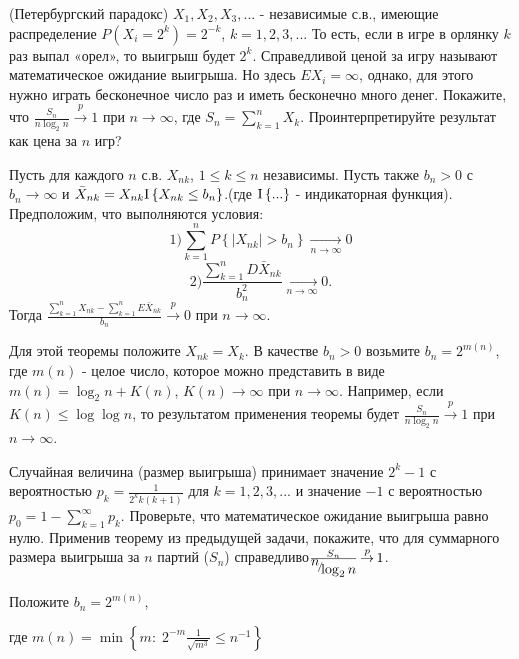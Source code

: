 \begin{problem}
(Петербургский парадокс) $X_{1} ,X_{2} ,X_{3} ,...$ - независимые с.в., имеющие распределение $P\left(X_{i} =2^{k} \right)=2^{-k} $, $k=1,2,3,...$ То есть, если в игре в орлянку $k$ раз выпал «орел», то выигрыш будет $2^{k} $. Справедливой ценой за игру называют математическое ожидание выигрыша. Но здесь $EX_{i} =\infty $, однако, для этого нужно играть бесконечное число раз и иметь бесконечно много денег. Покажите, что $\frac{S_{n} }{n\log _{2} n} \mathop{\to }\limits^{p} 1$ при $n\to \infty $, где $S_{n} =\sum _{k=1}^{n}X_{k}  $. Проинтерпретируйте результат как цена за $n$ игр?

\begin{ordre} 

Пусть для каждого $n$ с.в. $X_{nk} $, $1\le k\le n$ независимы. Пусть также $b_{n} >0$ с $b_{n} \to \infty $ и $\bar{X}_{nk} =X_{nk} {\rm I} \left\{X_{nk} \le b_{n} \right\}$.(где ${\rm I} \left\{...\right\}$ - индикаторная функция). Предположим, что выполняются условия:
\[1) \sum _{k=1}^{n}P\left\{\left|X_{nk} \right|>b_{n} \right\} \mathop{\to }\limits_{n\to \infty } 0\] 
\[2) \frac{\sum _{k=1}^{n}D\bar{X}_{nk}  }{b_{n} ^{2} } \mathop{\to }\limits_{n\to \infty } 0.\] 
Тогда $\frac{\sum _{k=1}^{n}X_{nk}  -\sum _{k=1}^{n}E\bar{X}_{nk}  }{b_{n} } \mathop{\to }\limits^{p} 0$ при $n\to \infty $.

\noindent Для этой теоремы положите $X_{nk} =X_{k} $. В качестве $b_{n} >0$ возьмите $b_{n} =2^{m(n)} $, где $m(n)$ - целое число, которое можно представить в виде $m(n)=\log _{2} n+K(n)$, $K(n)\to \infty $ при $n\to \infty $. Например, если $K(n)\le \log \log n$, то результатом применения теоремы будет $\frac{S_{n} }{n\log _{2} n} \mathop{\to }\limits^{p} 1$ при $n\to \infty $.

\end{ordre} 

\end{problem}

\begin{problem}

Случайная величина (размер выигрыша) принимает значение $2^{k} -1$ с вероятностью $p_{k} =\frac{1}{2^{k} k(k+1)} $ для $k=1,2,3,...$ и значение\textit{ $-1$} с вероятностью $p_{0} =1-\sum _{k=1}^{\infty }p_{k}  $. Проверьте, что математическое ожидание выигрыша равно нулю. Применив теорему из предыдущей задачи, покажите, что для суммарного размера выигрыша за $n$ партий ($S_{n} $) справедливо$\frac{S_{n} }{{\raise0.7ex\hbox{$ n $}\!\mathord{\left/ {\vphantom {n \log _{2} n}} \right. \kern-\nulldelimiterspace}\!\lower0.7ex\hbox{$ \log _{2} n $}} } \mathop{\to }\limits^{p} 1$.

\begin{ordre}  
Положите $b_{n} =2^{m(n)} $,

 где $m(n)=\min \left\{m:\; 2^{-m} \frac{1}{\sqrt{m^{3}}} \le n^{-1} \right\}$
\end{ordre} 

\end{problem}

